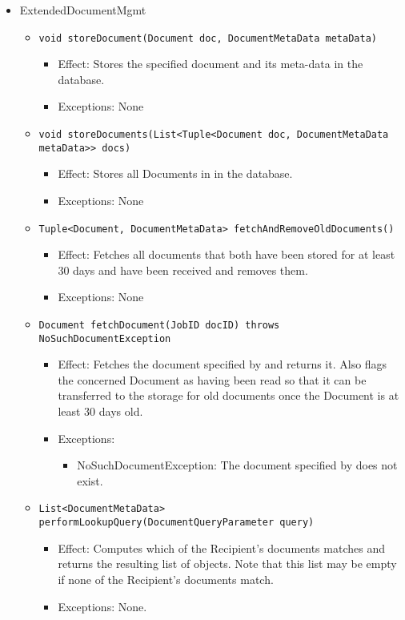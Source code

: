 \begin{itemize}
    \item ExtendedDocumentMgmt
	\begin{itemize}
		\item \texttt{void storeDocument(Document doc, DocumentMetaData metaData)}
		\begin{itemize}
			\item Effect: Stores the specified document and its meta-data in the database.
			\item Exceptions: None
		\end{itemize}

		\item \texttt{void storeDocuments(List<Tuple<Document doc, DocumentMetaData metaData>> docs)}
		\begin{itemize}
			\item Effect: Stores all Documents in  in the database.
			\item Exceptions: None
		\end{itemize}

		\item \texttt{Tuple<Document, DocumentMetaData> fetchAndRemoveOldDocuments()}
		\begin{itemize}
			\item Effect: Fetches all documents that both have been stored for at least 30 days and have been received and removes them.
			\item Exceptions: None
		\end{itemize}

		\item \texttt{Document fetchDocument(JobID docID) throws NoSuchDocumentException}
		\begin{itemize}
			\item Effect: Fetches the document specified by  and returns it. Also flags the concerned Document as having been read so that it can be transferred to the storage for old documents once the Document is at least 30 days old.
			\item Exceptions:
			\begin{itemize}
				\item NoSuchDocumentException: The document specified by  does not exist.
			\end{itemize}
		\end{itemize}
				
		\item \texttt{List<DocumentMetaData> performLookupQuery(DocumentQueryParameter query)}
		\begin{itemize}
			\item Effect: Computes which of the Recipient's documents matches  and returns the resulting list of  objects. Note that this list may be empty if none of the Recipient's documents match.
			\item Exceptions: None.
		\end{itemize}


\end{itemize}
\end{itemize}
